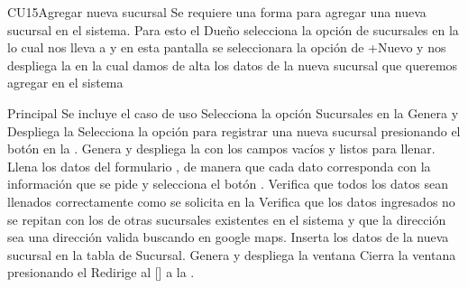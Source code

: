 \begin{UseCase}{CU15}{Agregar nueva sucursal}{
		Se requiere una forma para agregar una nueva sucursal en el sistema. Para esto el Dueño selecciona la opción de sucursales en la  lo cual nos lleva a  y en esta pantalla se seleccionara la opción de +Nuevo y nos despliega la   en la cual damos de alta los datos de la nueva sucursal que queremos agregar en el sistema
	}
	\end{UseCase}




	\begin{UCtrayectoria}{Principal}
		\UCpaso Se incluye el caso de uso 
		\UCpaso[\UCactor] Selecciona la opción Sucursales en la  
		\UCpaso Genera y Despliega la 
		\UCpaso[\UCactor] Selecciona la opción para registrar una nueva sucursal presionando el botón  en la .
		\UCpaso Genera y despliega la  con los campos vacíos y listos para llenar. 
		\UCpaso[\UCactor] Llena los datos del formulario , de manera que cada dato corresponda con la información que se pide y selecciona el botón  .   
		\UCpaso Verifica que todos los datos sean llenados correctamente como se solicita en la 
		\UCpaso Verifica que los datos ingresados no se repitan con los de otras sucursales existentes en el sistema y que la dirección sea una dirección valida buscando en google maps.  
		\UCpaso Inserta los datos de la nueva sucursal en la tabla de Sucursal. 
		\UCpaso Genera y despliega la ventana  
		\UCpaso [\UCactor] Cierra la ventana presionando el 
		\UCpaso Redirige al [\UCactor] a la  .
	\end{UCtrayectoria}


